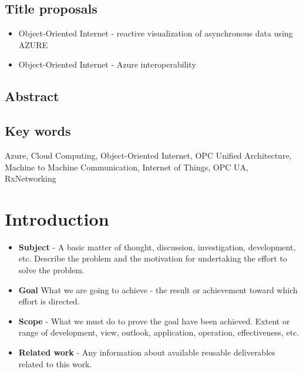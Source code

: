 \documentclass{article}
\providecommand{\tightlist} { \setlength{\itemsep}{0pt}\setlength{\parskip}{0pt}}
\begin{document}
\hypertarget{title-proposals}{%
  \subsection{Title proposals}\label{title-proposals}}

\begin{itemize}
  \tightlist
  \item
        Object-Oriented Internet - reactive visualization of asynchronous data
        using AZURE
  \item
        Object-Oriented Internet - Azure interoperability
\end{itemize}

\hypertarget{abstract}{%
  \subsection{Abstract}\label{abstract}}

\hypertarget{key-words}{%
  \subsection{Key words}\label{key-words}}

Azure, Cloud Computing, Object-Oriented Internet, OPC Unified
Architecture, Machine to Machine Communication, Internet of Things, OPC
UA, RxNetworking

\hypertarget{introduction}{%
  \section{Introduction}\label{introduction}}

\begin{itemize}
  \tightlist
  \item
        \textbf{Subject} - A basic matter of thought, discussion,
        investigation, development, etc. Describe the problem and the
        motivation for undertaking the effort to solve the problem.
  \item
        \textbf{Goal} What we are going to achieve - the result or achievement
        toward which effort is directed.
  \item
        \textbf{Scope} - What we must do to prove the goal have been achieved.
        Extent or range of development, view, outlook, application, operation,
        effectiveness, etc.
  \item
        \textbf{Related work} - Any information about available reusable
        deliverables related to this work.
\end{itemize}
\end{document}
